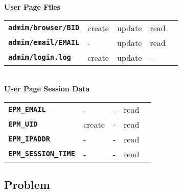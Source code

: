 \documentclass[12pt]{article}
\newcommand{\TT}[1]{{\tt \bfseries #1}}
\begin{document}
\begin{center}
{\bf User Page Files}
\\[1ex]
\begin{tabular}{lllll}
\TT{admim/browser/BID}	& create  & update & read \\
\TT{admim/email/EMAIL}	& -       & update & read \\
\TT{admim/login.log}	& create  & update & -    \\
\end{tabular}
\\[3ex]
{\bf User Page Session Data}
\\[1ex]
\begin{tabular}{lllll}
\TT{EPM\_EMAIL}	& -       & -      & read \\
\TT{EPM\_UID}	& create  & -      & read \\
\TT{EPM\_IPADDR}& -       & -      & read \\
\TT{EPM\_SESSION\_TIME}
                & -       & -      & read \\
\end{tabular}
\end{center}

\subsection{Problem}
\end{document}
